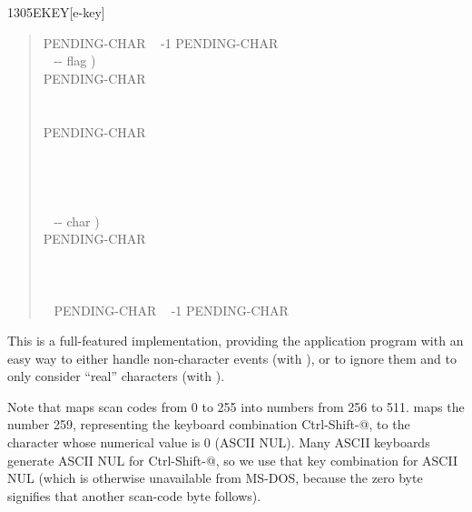 \begin{worddef}{1305}{EKEY}[e-key]
\begin{rationale}
\begin{quote}
\begin{tabbing}
			 PENDING-CHAR ~ -1 PENDING-CHAR \word{!} \\[\parskip]

			\+ \word{:} ~  -{}- flag ) \\
				\+ PENDING-CHAR    \\
					\+ ~   \\
						\+    \\
						\-	PENDING-CHAR \word{!}~   \\
					\-   \\
				\- ~   \\
			\- ~  \\
			\word{;} \\[\parskip]

			\+ \word{:} ~  -{}- char ) \\
				\+ PENDING-CHAR    \\
					~ ~    \\
					\>  \\
				\-	~  \\
			\- ~ PENDING-CHAR ~ -1 PENDING-CHAR \word{!} \\
			\word{;}
			\end{tabbing}
		\end{quote}

		This is a full-featured implementation, providing the
		application program with an easy way to either handle
		non-character events (with ), or to ignore them
		and to only consider ``real'' characters (with
		).

		Note that  maps scan codes from 0 to 255 into
		numbers from 256 to 511.  maps the number 259,
		representing the keyboard combination Ctrl-Shift-@, to the
		character whose numerical value is 0 (ASCII NUL). Many ASCII
		keyboards generate ASCII NUL for Ctrl-Shift-@, so we use that
		key combination for ASCII NUL (which is otherwise unavailable
		from MS-DOS, because the zero byte signifies that another
		scan-code byte follows).


\end{rationale}
\end{worddef}
